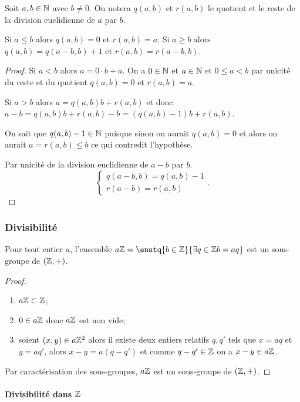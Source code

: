 Soit $a,b \in \mathbb{N}$ avec $b \neq 0$. On notera $q(a,b)$ et $r(a,b)$ le quotient et le reste de la division euclidienne de $a$ par $b$.

\begin{prop}
  Si $a \leq b$ alors $q(a,b)=0$ et $r(a,b)=a$. Si $a \geq b$ alors $q(a,b)=q(a-b,b)+1$ et $r(a,b)=r(a-b,b)$.
\end{prop}
\begin{proof}
  Si $a < b$ alors $a=0 \cdot b + a$. On a $0 \in \mathbb{N}$ et $a \in \mathbb{N}$ et $0 \leq a <b$ par unicité du reste et du quotient $q(a,b)=0$ et $r(a,b)=a$.

Si $a > b$ alors $a=q(a,b)b+r(a,b)$ et donc $a-b=q(a,b)b+r(a,b)-b=(q(a,b)-1)b+r(a,b)$.

On sait que $q(a,b)-1 \in \mathbb{N}$ puisque sinon on aurait $q(a,b) =0$ et alors on aurait $a=r(a,b) \leq b$ ce qui contredit l'hypothèse.

Par unicité de la division euclidienne de $a-b$ par $b$.
\begin{equation}
  \begin{cases}
    q(a-b,b) = q(a,b)-1 \\ r(a-b)=r(a,b)
  \end{cases}.
\end{equation}
\end{proof}

\subsubsection{Divisibilité}

\begin{prop}
  Pour tout entier $a$, l'ensemble $a\Z=\enstq{b \in \Z}{\exists q \in \Z b=aq}$ est un sous-groupe de $(\mathbb{Z},+)$.
\end{prop}
\begin{proof}
  \begin{enumerate}
  \item $a\mathbb{Z} \subset \mathbb{Z}$;
  \item $0 \in a\mathbb{Z}$ donc $a\mathbb{Z}$ est non vide;
  \item soient $(x,y) \in a\mathbb{Z}^2$ alors il existe deux entiers relatifs $q,q'$ tels que $x=aq$ et $y=aq'$, alors $x-y=a(q-q')$ et comme $q-q' \in \mathbb{Z}$ on a $x-y \in a\mathbb{Z}$.
  \end{enumerate}
Par caractérisation des sous-groupes, $a\mathbb{Z}$ est un sous-groupe de $(\mathbb{Z},+)$.
\end{proof}

\paragraph{Divisibilité dans $\mathbb{Z}$}

